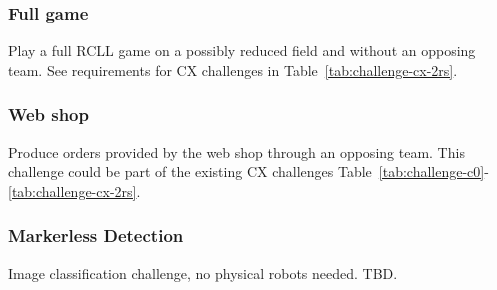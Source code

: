 \documentclass[12pt,twoside]{article}
\newcommand{\reftab}[1]{Table~\ref{#1}}
\begin{document}
\subsubsection{Full game}\label{sec:challenge-full-game}
Play a full RCLL game on a possibly reduced field and without an opposing team.
See requirements for CX challenges in \reftab{tab:challenge-cx-2rs}.

\subsubsection{Web shop}\label{sec:challenge-CX-1rs}
Produce orders provided by the web shop through an opposing team.
This challenge could be part of the existing CX challenges
\reftab{tab:challenge-c0}-\ref{tab:challenge-cx-2rs}.

\subsubsection{Markerless Detection}\label{sec:challenge-markerless}
Image classification challenge, no physical robots needed. TBD.
\end{document}
